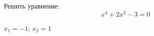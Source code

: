 \begin{ex}
	Решить уравнение:
	$$ x^4+2x^2-3=0 $$
	\begin{answer}
		$x_1=-1$; $x_2=1$
	\end{answer}
\end{ex}